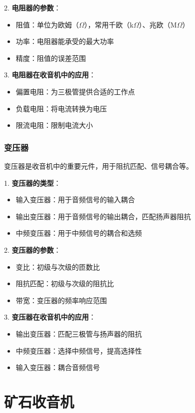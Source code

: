 \documentclass[12pt,UTF8]{ctexbook}
\begin{document}
2. \textbf{电阻器的参数}：
   \begin{itemize}[leftmargin=3.5em]
   \item 阻值：单位为欧姆（$\Omega$），常用千欧（k$\Omega$）、兆欧（M$\Omega$）
   \item 功率：电阻器能承受的最大功率
   \item 精度：阻值的误差范围
   \end{itemize}

3. \textbf{电阻器在收音机中的应用}：
   \begin{itemize}[leftmargin=3.5em]
   \item 偏置电阻：为三极管提供合适的工作点
   \item 负载电阻：将电流转换为电压
   \item 限流电阻：限制电流大小
   \end{itemize}

\section{变压器}

变压器是收音机中的重要元件，用于阻抗匹配、信号耦合等。

1. \textbf{变压器的类型}：
   \begin{itemize}[leftmargin=3.5em]
   \item 输入变压器：用于音频信号的输入耦合
   \item 输出变压器：用于音频信号的输出耦合，匹配扬声器阻抗
   \item 中频变压器：用于中频信号的耦合和选频
   \end{itemize}

2. \textbf{变压器的参数}：
   \begin{itemize}[leftmargin=3.5em]
   \item 变比：初级与次级的匝数比
   \item 阻抗匹配：初级与次级的阻抗比
   \item 带宽：变压器的频率响应范围
   \end{itemize}

3. \textbf{变压器在收音机中的应用}：
   \begin{itemize}[leftmargin=3.5em]
   \item 输出变压器：匹配三极管与扬声器的阻抗
   \item 中频变压器：选择中频信号，提高选择性
   \item 输入变压器：耦合音频信号
   \end{itemize}

\part{矿石收音机}
\end{document}
